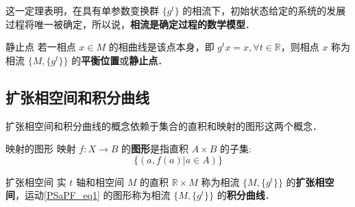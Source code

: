 这一定理表明，在具有单参数变换群 $\{g^t\}$ 的相流下，初始状态给定的系统的发展过程将唯一被确定，所以说，\textbf{相流是确定过程的数学模型}．
\begin{definition}{静止点}
若一相点 $x\in M$ 的相曲线是该点本身，即 $g^t x=x,\forall t\in\mathbb R$，则相点 $x$ 称为相流 $\{M,\{g^t\}\}$ 的\textbf{平衡位置}或\textbf{静止点}．
\end{definition}
\subsection{扩张相空间和积分曲线}
扩张相空间和积分曲线的概念依赖于集合的直积和映射的图形这两个概念．
\begin{definition}{映射的图形}
映射 $f:X\rightarrow B$ 的\textbf{图形}是指直积 $A\times B$ 的子集:
\begin{equation}
\{(a,f(a)|a\in A)\}
\end{equation}
\end{definition}
\begin{definition}{扩张相空间}
实 $t$ 轴和相空间 $M$ 的直积 $\mathbb R\times M$ 称为相流 $\{M,\{g^t\}\}$ 的\textbf{扩张相空间}，运动\autoref{PSaPF_eq1} 的图形称为相流 $\{M,\{g^t\}\}$ 的\textbf{积分曲线}．
\end{definition}